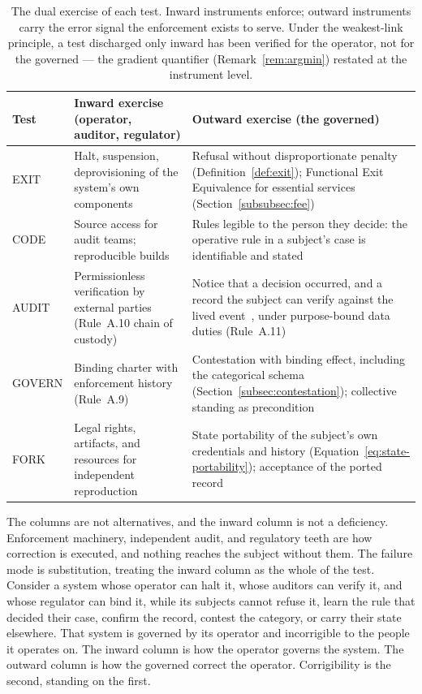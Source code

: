 \documentclass{article}
\begin{document}
\begin{table}[htbp]
\centering
\small
\caption{The dual exercise of each test. Inward instruments enforce; outward instruments carry the error signal the enforcement exists to serve. Under the weakest-link principle, a test discharged only inward has been verified for the operator, not for the governed --- the gradient quantifier (Remark~\ref{rem:argmin}) restated at the instrument level.}
\label{tab:dual-exercise}
\begin{tabular}{@{}lp{5.2cm}p{5.2cm}@{}}
\toprule
\textbf{Test} & \textbf{Inward exercise (operator, auditor, regulator)} & \textbf{Outward exercise (the governed)} \\
\midrule
EXIT & Halt, suspension, deprovisioning of the system's own components & Refusal without disproportionate penalty (Definition~\ref{def:exit}); Functional Exit Equivalence for essential services (Section~\ref{subsubsec:fee}) \\
CODE & Source access for audit teams; reproducible builds & Rules legible to the person they decide: the operative rule in a subject's case is identifiable and stated \\
AUDIT & Permissionless verification by external parties (Rule~A.10 chain of custody) & Notice that a decision occurred, and a record the subject can verify against the lived event~\citep{aravind2026epi}, under purpose-bound data duties (Rule~A.11) \\
GOVERN & Binding charter with enforcement history (Rule~A.9) & Contestation with binding effect, including the categorical schema (Section~\ref{subsec:contestation}); collective standing as precondition \\
FORK & Legal rights, artifacts, and resources for independent reproduction & State portability of the subject's own credentials and history (Equation~\ref{eq:state-portability}); acceptance of the ported record \\
\bottomrule
\end{tabular}
\end{table}

The columns are not alternatives, and the inward column is not a deficiency. Enforcement machinery, independent audit, and regulatory teeth are how correction is executed, and nothing reaches the subject without them. The failure mode is substitution, treating the inward column as the whole of the test. Consider a system whose operator can halt it, whose auditors can verify it, and whose regulator can bind it, while its subjects cannot refuse it, learn the rule that decided their case, confirm the record, contest the category, or carry their state elsewhere. That system is governed by its operator and incorrigible to the people it operates on. The inward column is how the operator governs the system. The outward column is how the governed correct the operator. Corrigibility is the second, standing on the first.
\end{document}
